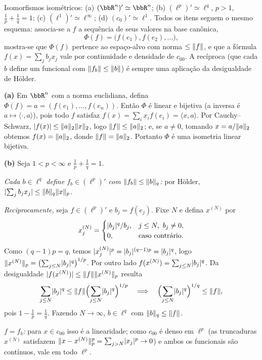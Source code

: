 \begin{exercicio}{Isomorfismos isométricos: (a) $(\R^n)'\simeq\R^n$; (b) $(\ell^p)'\simeq \ell^q$, $p>1$, $\frac1p+\frac1q=1$; (c) $(\ell^1)'\simeq \ell^\infty$; (d) $(c_0)'\simeq \ell^1$.}
\sol
Todos os itens seguem o mesmo esquema: associa-se a $f$ a sequência de seus valores na base canônica,
\[ \Phi(f)=\bigl(f(e_1),f(e_2),\dots\bigr), \]
mostra-se que $\Phi(f)$ pertence ao espaço-alvo com norma $\le\lVert f\rVert$, e que a fórmula $f(x)=\sum_jb_jx_j$ vale por continuidade e densidade de $c_{00}$. A recíproca (que cada $b$ define um funcional com $\lVert f_b\rVert\le\lVert b\rVert$) é sempre uma aplicação da desigualdade de Hölder.

\textbf{(a)} Em $\R^n$ com a norma euclidiana, defina $\Phi(f)=a=(f(e_1),\dots,f(e_n))$. Então $\Phi$ é linear e bijetiva (a inversa é $a\mapsto\langle\cdot,a\rangle$), pois todo $f$ satisfaz $f(x)=\sum_i x_if(e_i)=\langle x,a\rangle$. Por Cauchy--Schwarz, $\lvert f(x)\rvert\le\lVert a\rVert_2\lVert x\rVert_2$, logo $\lVert f\rVert\le\lVert a\rVert_2$; e, se $a\neq0$, tomando $x=a/\lVert a\rVert_2$ obtemos $f(x)=\lVert a\rVert_2$, donde $\lVert f\rVert=\lVert a\rVert_2$. Portanto $\Phi$ é uma isometria linear bijetiva.

\textbf{(b)} Seja $1<p<\infty$ e $\frac1p+\frac1q=1$.

\emph{Cada $b\in \ell^q$ define $f_b\in(\ell^p)'$ com $\lVert f_b\rVert\le\lVert b\rVert_q$:} por Hölder, $\lvert\sum_jb_jx_j\rvert\le\lVert b\rVert_q\lVert x\rVert_p$.

\emph{Reciprocamente,} seja $f\in(\ell^p)'$ e $b_j=f(e_j)$. Fixe $N$ e defina $x^{(N)}$ por
\[ x^{(N)}_j=\begin{cases} \lvert b_j\rvert^{q}/b_j, & j\le N,\ b_j\neq0,\\ 0,&\text{caso contrário}.\end{cases} \]
Como $(q-1)p=q$, temos $\lvert x_j^{(N)}\rvert^p=\lvert b_j\rvert^{(q-1)p}=\lvert b_j\rvert^q$, logo $\lVert x^{(N)}\rVert_p=\bigl(\sum_{j\le N}\lvert b_j\rvert^q\bigr)^{1/p}$. Por outro lado $f(x^{(N)})=\sum_{j\le N}\lvert b_j\rvert^q$. Da desigualdade $\lvert f(x^{(N)})\rvert\le\lVert f\rVert\lVert x^{(N)}\rVert_p$ resulta
\[ \sum_{j\le N}\lvert b_j\rvert^q\le\lVert f\rVert\Bigl(\sum_{j\le N}\lvert b_j\rvert^q\Bigr)^{1/p} \quad\Longrightarrow\quad \Bigl(\sum_{j\le N}\lvert b_j\rvert^q\Bigr)^{1/q}\le\lVert f\rVert, \]
pois $1-\frac1p=\frac1q$. Fazendo $N\to\infty$, $b\in \ell^q$ com $\lVert b\rVert_q\le\lVert f\rVert$.

\emph{$f=f_b$:} para $x\in c_{00}$ isso é a linearidade; como $c_{00}$ é denso em $\ell^p$ (as truncaduras $x^{(N)}$ satisfazem $\lVert x-x^{(N)}\rVert_p^p=\sum_{j>N}\lvert x_j\rvert^p\to0$) e ambos os funcionais são contínuos, vale em todo $\ell^p$.


\end{exercicio}
